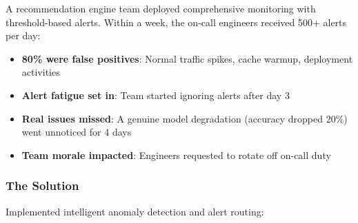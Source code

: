 A recommendation engine team deployed comprehensive monitoring with threshold-based alerts. Within a week, the on-call engineers received 500+ alerts per day:

\begin{itemize}
    \item \textbf{80\% were false positives}: Normal traffic spikes, cache warmup, deployment activities
    \item \textbf{Alert fatigue set in}: Team started ignoring alerts after day 3
    \item \textbf{Real issues missed}: A genuine model degradation (accuracy dropped 20\%) went unnoticed for 4 days
    \item \textbf{Team morale impacted}: Engineers requested to rotate off on-call duty
\end{itemize}

\subsubsection{The Solution}

Implemented intelligent anomaly detection and alert routing:

